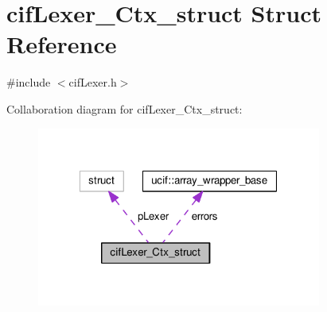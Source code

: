 \hypertarget{structcif_lexer___ctx__struct}{\section{cif\-Lexer\-\_\-\-Ctx\-\_\-struct Struct Reference}
\label{structcif_lexer___ctx__struct}
}


{\ttfamily \#include $<$cif\-Lexer.\-h$>$}



Collaboration diagram for cif\-Lexer\-\_\-\-Ctx\-\_\-struct\-:
\nopagebreak
\begin{figure}[H]
\begin{center}
\leavevmode
\includegraphics[width=265pt]{structcif_lexer___ctx__struct__coll__graph}
\end{center}
\end{figure}

